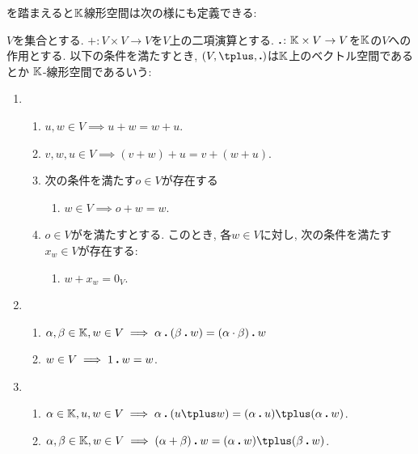 を踏まえると$\mathbb{K}$線形空間は次の様にも定義できる:
\begin{definition}
$V$を集合とする.
$\plus\colon V\times V \to V$を$V$上の二項演算とする.
$\mathbin{\boldsymbol{.}} \colon \mathbb{K}\times V \to V$を$\mathbb{K}$の$V$への作用とする.
以下の条件を満たすとき,
$(V,\plus,\act)$は$\mathbb{K}$上のベクトル空間であるとか
$\mathbb{K}$-線形空間であるいう:
  \begin{enumerate}
  \item 
    \begin{enumerate}
    \item $u,w \in V\implies  u\plus w=w\plus u$.
    \item
      \label{def:vecsp:item:sum:ass}
      $v,w,u\in V \implies (v\plus w)\plus u=v\plus (w\plus u)$.
    \item
    次の条件を満たす$o\in V$が存在する
    \begin{enumerate}
          \label{def:vecsp:item:sum:zero}
    \item $w\in V \implies o\plus w=w$.
    \end{enumerate}
    \item
    $o\in V$がを満たすとする.
    このとき,
    各$w\in V$に対し, 次の条件を満たす$x_w\in V$が存在する:
\begin{enumerate}
\item $w\plus x_w=0_V$.
\end{enumerate}
    \end{enumerate}
  \item
    \begin{enumerate}
    \item
      \label{def:vecsp:item:prod:ass}
      $\alpha ,\beta\in\mathbb{K}, w\in V \implies \alpha \mathbin{\boldsymbol{.}} (\beta\mathbin{\boldsymbol{.}} w)=(\alpha \cdot \beta)\mathbin{\boldsymbol{.}} w$
    \item $w\in V \implies 1\mathbin{\boldsymbol{.}} w=w$.
    \end{enumerate}
  \item
    \begin{enumerate}
    \item $\alpha \in \KK,u,w\in V \implies \alpha \act (u\plus w)=(\alpha \act u)\plus (\alpha \act w)$.
    \item $\alpha ,\beta\in\KK, w\in V\implies (\alpha +\beta)\act w=(\alpha\act w)\plus (\beta\act w)$.
    \end{enumerate}
  \end{enumerate}
\end{definition}







